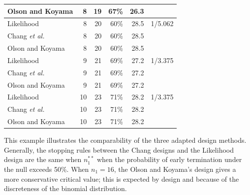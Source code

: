 \documentclass[12pt]{report}\usepackage[]{graphicx}\usepackage[]{color}
\newlength{\li}\setlength{\li}{14.48pt}
\newlength{\di}\setlength{\di}{-3.5mm}
\begin{document}
\begin{table}[]
\begin{tabular}{|L|R|R|R|R|L|}
Olson and Koyama & 8     & 19    & 67\%           & 26.3          &                                                                                    \\ \hline
Likelihood       & 8     & 20    & 60\%           & 28.5          & 1/5.062                                                                            \\ \hline
Chang \textit{et al.}           & 8     & 20    & 60\%           & 28.5          &                                                                                    \\ \hline
Olson and Koyama & 8     & 20    & 60\%           & 28.5          &                                                                                    \\ \hline
Likelihood       & 9     & 21    & 69\%           & 27.2          & 1/3.375                                                                            \\ \hline
Chang \textit{et al.}         & 9     & 21    & 69\%           & 27.2          &                                                                                    \\ \hline
Olson and Koyama & 9     & 21    & 69\%           & 27.2          &                                                                                    \\ \hline
Likelihood       & 10    & 23    & 71\%           & 28.2          & 1/3.375                                                                            \\ \hline
Chang \textit{et al.}  & 10    & 23    & 71\%           & 28.2          &                                                                                    \\ \hline
Olson and Koyama & 10    & 23    & 71\%           & 28.2          &                                                                                    \\ \hline
\end{tabular}
\hspace*{-0.1cm}
\end{table}

This example illustrates the comparability of the three adapted design methods. Generally, the stopping rules between the Chang designs and the Likelihood design are the same when $n_1^{\ast\ast}$ when the probability of early termination under the null exceeds 50\%. When $n_1 = 16$, the Olson and Koyama's design gives a more conservative critical value; this is expected by design and because of the discreteness of the binomial distribution. 
\end{document}
